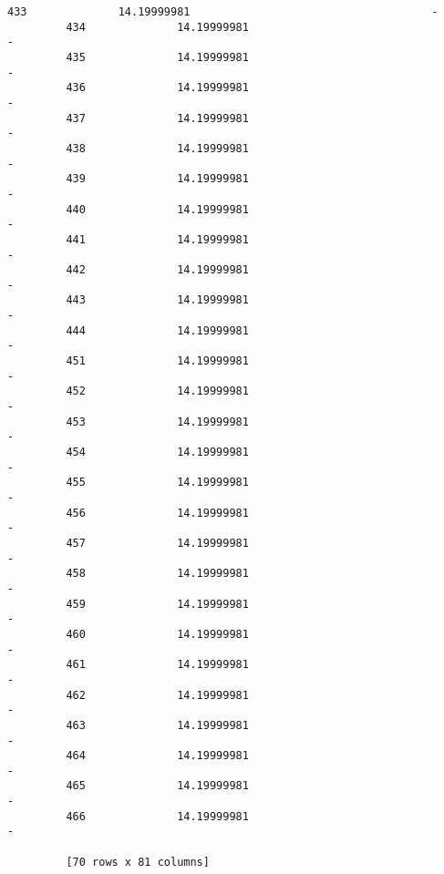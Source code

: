 \documentclass[11pt]{article}
\begin{document}
\begin{Verbatim}[commandchars=\\\{\}]
         433              14.19999981                                     -  
         434              14.19999981                                     -  
         435              14.19999981                                     -  
         436              14.19999981                                     -  
         437              14.19999981                                     -  
         438              14.19999981                                     -  
         439              14.19999981                                     -  
         440              14.19999981                                     -  
         441              14.19999981                                     -  
         442              14.19999981                                     -  
         443              14.19999981                                     -  
         444              14.19999981                                     -  
         451              14.19999981                                     -  
         452              14.19999981                                     -  
         453              14.19999981                                     -  
         454              14.19999981                                     -  
         455              14.19999981                                     -  
         456              14.19999981                                     -  
         457              14.19999981                                     -  
         458              14.19999981                                     -  
         459              14.19999981                                     -  
         460              14.19999981                                     -  
         461              14.19999981                                     -  
         462              14.19999981                                     -  
         463              14.19999981                                     -  
         464              14.19999981                                     -  
         465              14.19999981                                     -  
         466              14.19999981                                     -  
         
         [70 rows x 81 columns]
\end{Verbatim}
            
\end{document}
